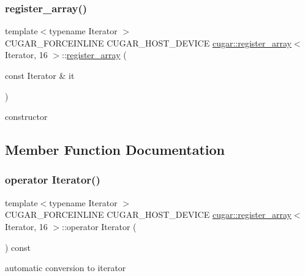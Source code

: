 \subsubsection{\texorpdfstring{register\+\_\+array()}{register\_array()}\hspace{0.1cm}{\footnotesize\ttfamily [2/2]}}
{\footnotesize\ttfamily template$<$typename Iterator $>$ \\
C\+U\+G\+A\+R\+\_\+\+F\+O\+R\+C\+E\+I\+N\+L\+I\+NE C\+U\+G\+A\+R\+\_\+\+H\+O\+S\+T\+\_\+\+D\+E\+V\+I\+CE \hyperlink{structcugar_1_1register__array}{cugar\+::register\+\_\+array}$<$ Iterator, 16 $>$\+::\hyperlink{structcugar_1_1register__array}{register\+\_\+array} (\begin{DoxyParamCaption}\item[{const Iterator \&}]{it }\end{DoxyParamCaption})\hspace{0.3cm}{\ttfamily [inline]}}

constructor 

\subsection{Member Function Documentation}
\mbox{\label{structcugar_1_1register__array_3_01_iterator_00_0116_01_4_a66d2f654e805522f74a8f14bb746aeea}} 
\subsubsection{\texorpdfstring{operator Iterator()}{operator Iterator()}}
{\footnotesize\ttfamily template$<$typename Iterator $>$ \\
C\+U\+G\+A\+R\+\_\+\+F\+O\+R\+C\+E\+I\+N\+L\+I\+NE C\+U\+G\+A\+R\+\_\+\+H\+O\+S\+T\+\_\+\+D\+E\+V\+I\+CE \hyperlink{structcugar_1_1register__array}{cugar\+::register\+\_\+array}$<$ Iterator, 16 $>$\+::operator Iterator (\begin{DoxyParamCaption}{ }\end{DoxyParamCaption}) const\hspace{0.3cm}{\ttfamily [inline]}}

automatic conversion to iterator \mbox{\label{structcugar_1_1register__array_3_01_iterator_00_0116_01_4_af3438ad40ff2308ffd402514f9eb3982}} 
